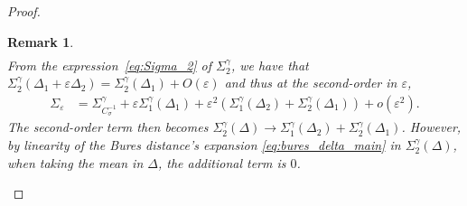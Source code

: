\documentclass[11pt]{article}
\newtheorem{remark}{Remark}
\begin{document}
\begin{proof}
\begin{remark}
\begin{align*}
\end{align*}
From the expression~\eqref{eq:Sigma_2} of $\Sigma^\gamma_2$, we have that $\Sigma^\gamma_2(\Delta_1 + \varepsilon  \Delta_2) = \Sigma^\gamma_2(\Delta_1) + O(\varepsilon)$ and thus at the second-order in $\varepsilon$, 
\begin{align*}
\Sigma_\varepsilon
&= \Sigma^\gamma_{C_\sigma^{-1}} + \varepsilon \Sigma^\gamma_1(\Delta_1) + \varepsilon^2 \left(\Sigma^\gamma_1(\Delta_2) +  \Sigma^\gamma_2(\Delta_1) \right) + o(\varepsilon^2) .
\end{align*}
The second-order term then becomes $\Sigma^\gamma_2(\Delta) \to \Sigma^\gamma_1(\Delta_2) +  \Sigma^\gamma_2(\Delta_1)$. However, by linearity of the Bures distance's expansion \eqref{eq:bures_delta_main} in $\Sigma^\gamma_2(\Delta)$, when taking the mean in $\Delta$, the additional term is $0$.
\end{remark}


\end{proof}
\end{document}
